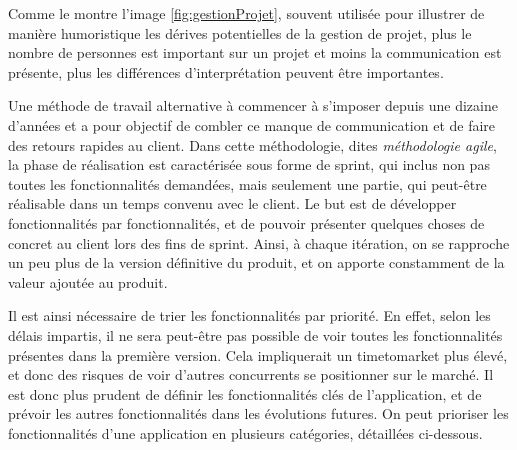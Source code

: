 
Comme le montre l'image \ref{fig:gestionProjet}, souvent utilisée pour illustrer de manière humoristique les dérives potentielles de la gestion de projet, plus le nombre de personnes est important sur un projet et moins la communication est présente, plus les différences d'interprétation peuvent être importantes. 

Une méthode de travail alternative à commencer à s'imposer depuis une dizaine d'années et a pour objectif de combler ce manque de communication et de faire des retours rapides au client. Dans cette méthodologie, dites \emph{méthodologie agile}, la phase de réalisation est caractérisée sous forme de sprint, qui inclus non pas toutes les fonctionnalités demandées, mais seulement une partie, qui peut-être réalisable dans un temps convenu avec le client. Le but est de développer fonctionnalités par fonctionnalités, et de pouvoir présenter quelques choses de concret au client lors des fins de sprint. Ainsi, à chaque itération, on se rapproche un peu plus de la version définitive du produit, et on apporte constamment de la valeur ajoutée au produit.

Il est ainsi nécessaire de trier les fonctionnalités par priorité. En effet, selon les délais impartis, il ne sera peut-être pas possible de voir toutes les fonctionnalités présentes dans la première version. Cela impliquerait un \gls{timetomarket} plus élevé, et donc des risques de voir d'autres concurrents se positionner sur le marché. Il est donc plus prudent de définir les fonctionnalités clés de l'application, et de prévoir les autres fonctionnalités dans les évolutions futures. On peut prioriser les fonctionnalités d'une application en plusieurs catégories, détaillées ci-dessous.

